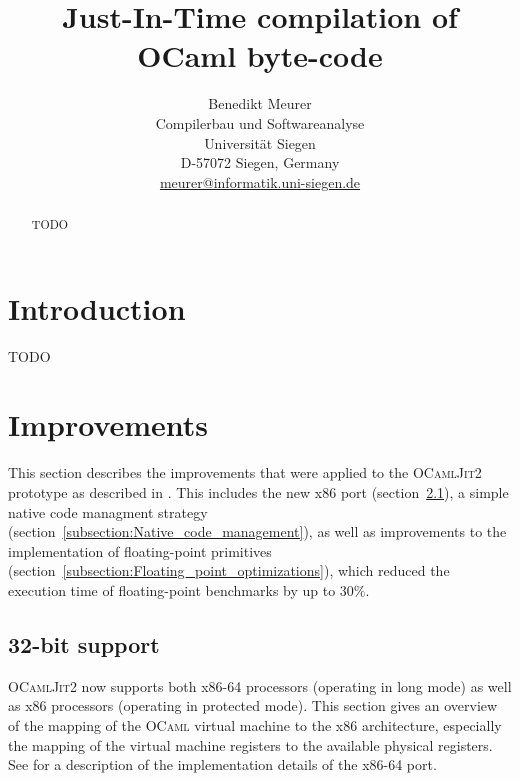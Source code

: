 \documentclass[12pt,a4paper,final]{article}
\begin{document}
\title{%
  Just-In-Time compilation of OCaml byte-code
}
\author{%
  Benedikt Meurer\\
  Compilerbau und Softwareanalyse\\
  Universit\"at Siegen\\
  D-57072 Siegen, Germany\\
  \url{meurer@informatik.uni-siegen.de}
}
\date{}
\maketitle
\begin{abstract}
  TODO
\end{abstract}


\section{Introduction}

TODO


\section{Improvements} \label{section:Improvements}

This section describes the improvements that were applied to the \textsc{OCamlJit2} prototype
as described in \cite{Meurer10:OCamlJit2.0}. This
includes the new x86 port (section~\ref{subsection:32_bit_support}), a simple native code managment
strategy (section~\ref{subsection:Native_code_management}), as well as improvements
to the implementation of floating-point primitives (section~\ref{subsection:Floating_point_optimizations}),
which reduced the execution time of floating-point benchmarks by up to $30\%$.

\subsection{32-bit support} \label{subsection:32_bit_support}

\textsc{OCamlJit2} now supports both x86-64 processors (operating in long mode)
as well as x86 processors (operating in protected mode). This section gives an
overview of the mapping of the \textsc{OCaml} virtual machine to the x86
architecture, especially the mapping of the virtual machine registers to the available
physical registers. See \cite{Meurer10:OCamlJit2.0} for a description of the implementation
details of the x86-64 port.
\end{document}
